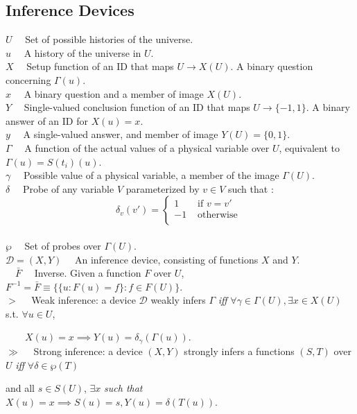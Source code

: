 \documentclass[11pt]{article}
\begin{document}
\subsection{Inference Devices} 
$ U \quad $ Set of possible histories of the universe. \\
$ u \quad $ A history of the universe in $ U $. \\ 
$ X \quad $ Setup function of an ID that maps $ U \rightarrow X(U) $. A binary question concerning $ \Gamma(u) $. \\
$ x \quad $ A binary question and a member of image $ X(U) $. \\ 
$ Y \quad $ Single-valued conclusion function of an ID that maps $ U \rightarrow \{-1, 1\} $. A binary answer of an ID for  $ X(u) = x $. \\ 
$ y \quad $ A single-valued answer, and member of image $ Y(U)  = \{0, 1\} $. \\ 
$ \Gamma \quad $ A function of the actual values of a physical variable over $U$, equivalent to $\Gamma(u) = S(t_i)(u)$.  \\
$ \gamma \quad $ Possible value of a physical variable, a member of the image $\Gamma(U)$. \\
$ \delta \quad $ Probe of any variable $V$ parameterized by $v \in V$ such that : 
	  \[ \delta_v (v') =
	  \begin{cases} 
       1 & \text{ if } v = v' \\
       -1 & \text{ otherwise } \\
      \end{cases}\] \\
$ \wp \quad $ Set of probes over $\Gamma(U)$. \\
$ \mathcal{D} = (X, Y) \quad $ An inference device, consisting of functions $ X $ and $ Y $. \\
$ \quad \bar{F} \quad $ Inverse. Given a function $ F $ over $ U $, $F ^ {-1} = \bar{F} \equiv \{\{u : F(u) = f \} : f \in F(U) \} $. \\
$ > \quad $ Weak inference: a device $\mathcal{D}$ weakly infers $\Gamma$ \textit{iff} $ \forall \gamma \in \Gamma(U), \exists x \in X(U) $ s.t. $ \forall u \in U $, 

$ \quad \quad X(u) = x \implies Y(u) = \delta_{\gamma}(\Gamma(u)) $.  \\
$ \gg \quad $ Strong inference: a device $ (X, Y) $ strongly infers a functions $ (S, T) $ over $ U $ \textit{ iff } $\forall \delta \in \wp(T) $ 

\quad \quad and all $ s \in S(U) $, $ \exists x $ \textit{ such that } $ X(u) = x \implies S(u) = s, Y(u) = \delta(T(u)) $. \\
\end{document}
